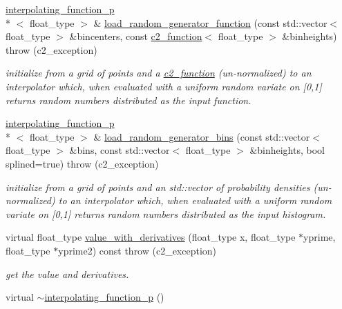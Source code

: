 \begin{DoxyCompactItemize}
\hyperlink{classinterpolating__function__p}{interpolating\-\_\-function\-\_\-p}\\*
$<$ float\-\_\-type $>$ \& \hyperlink{classinterpolating__function__p_ad9a0b81a99d4ee1fe4511e2435a7f0e0}{load\-\_\-random\-\_\-generator\-\_\-function} (const std\-::vector$<$ float\-\_\-type $>$ \&bincenters, const \hyperlink{classc2__function}{c2\-\_\-function}$<$ float\-\_\-type $>$ \&binheights)  throw (c2\-\_\-exception)
\begin{DoxyCompactList}\small\item\em initialize from a grid of points and a \hyperlink{classc2__function}{c2\-\_\-function} (un-\/normalized) to an interpolator which, when evaluated with a uniform random variate on \mbox{[}0,1\mbox{]} returns random numbers distributed as the input function. \end{DoxyCompactList}\item 
\hyperlink{classinterpolating__function__p}{interpolating\-\_\-function\-\_\-p}\\*
$<$ float\-\_\-type $>$ \& \hyperlink{classinterpolating__function__p_a8587a27f028c9f6d8889967c38d25d88}{load\-\_\-random\-\_\-generator\-\_\-bins} (const std\-::vector$<$ float\-\_\-type $>$ \&bins, const std\-::vector$<$ float\-\_\-type $>$ \&binheights, bool splined=true)  throw (c2\-\_\-exception)
\begin{DoxyCompactList}\small\item\em initialize from a grid of points and an std\-::vector of probability densities (un-\/normalized) to an interpolator which, when evaluated with a uniform random variate on \mbox{[}0,1\mbox{]} returns random numbers distributed as the input histogram. \end{DoxyCompactList}\item 
virtual float\-\_\-type \hyperlink{classinterpolating__function__p_a321e6a9a8e598ebb0ae77ce265742ed7}{value\-\_\-with\-\_\-derivatives} (float\-\_\-type x, float\-\_\-type $\ast$yprime, float\-\_\-type $\ast$yprime2) const   throw (c2\-\_\-exception)
\begin{DoxyCompactList}\small\item\em get the value and derivatives. \end{DoxyCompactList}\item 
\hypertarget{classinterpolating__function__p_a24f78c2f0f5dc80cfbd87ada46d1367e}{virtual \hyperlink{classinterpolating__function__p_a24f78c2f0f5dc80cfbd87ada46d1367e}{$\sim$interpolating\-\_\-function\-\_\-p} ()}\label{classinterpolating__function__p_a24f78c2f0f5dc80cfbd87ada46d1367e}


\end{DoxyCompactItemize}
